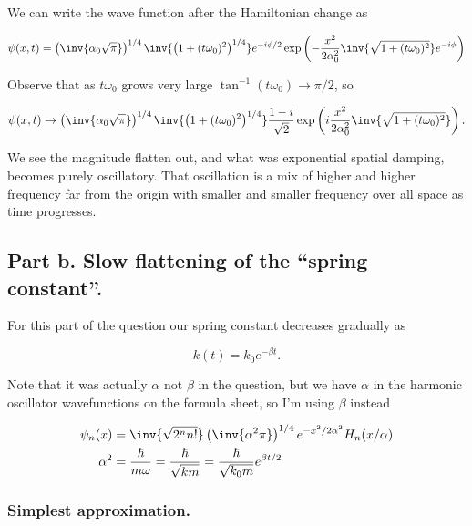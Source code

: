 We can write the wave function after the Hamiltonian change as

\begin{equation}\label{eqn:qmTwoExamReflection:310b}
\psi(x, t) = 
\left( \inv{\alpha_0 \sqrt{\pi}} \right)^{1/4}
\inv{\left( 1 + (t \omega_0)^2 \right)^{1/4}}
e^{-i \phi/2}
\exp\left(
-\frac{x^2}{2 \alpha_0^2} \inv{\sqrt{1 + (t \omega_0)^2}} e^{-i \phi}
\right)
\end{equation}

Observe that as $t \omega_0$ grows very large $\tan^{-1}(t \omega_0) \rightarrow \pi/2$, so 

\begin{equation}\label{eqn:qmTwoExamReflection:310c}
\psi(x, t) \rightarrow
\left( \inv{\alpha_0 \sqrt{\pi}} \right)^{1/4}
\inv{\left( 1 + (t \omega_0)^2 \right)^{1/4}}
\frac{1 - i}{\sqrt{2}}
\exp\left(
i\frac{x^2}{2 \alpha_0^2} \inv{\sqrt{1 + (t \omega_0)^2}} 
\right).
\end{equation}

We see the magnitude flatten out, and what was exponential spatial damping, becomes purely oscillatory.  That oscillation is a mix of higher and higher frequency far from the origin with smaller and smaller frequency over all space as time progresses.

\subsection{Part b.  Slow flattening of the ``spring constant''.}

For this part of the question our spring constant decreases gradually as

\begin{equation}\label{eqn:qmTwoExamReflection:n}
k(t) = k_0 e^{-\beta t}.
\end{equation}

Note that it was actually $\alpha$ not $\beta$ in the question, but we have $\alpha$ in the harmonic oscillator wavefunctions on the formula sheet, so I'm using $\beta$ instead

\begin{align}\label{eqn:qmTwoExamReflection:n}
\psi_n(x) &= \inv{\sqrt{2^n n!}} \left(\inv{\alpha^2 \pi}\right)^{1/4} e^{-x^2/2\alpha^2} H_n(x/\alpha) \\
\alpha^2 &= \frac{\hbar}{m \omega} 
= \frac{\hbar}{\sqrt{k m}} 
= \frac{\hbar}{\sqrt{k_0 m}} e^{\beta t/2}
\end{align}

\subsubsection{Simplest approximation.}

